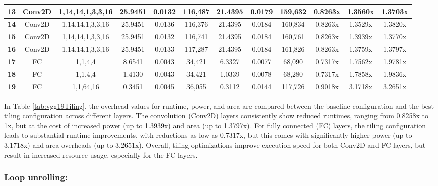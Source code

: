 \begin{table}[htbp]
{\begin{tabular}{|c|c|c|c|c|c|c|c|c|c|c|c|}
\textbf{13} & Conv2D & 1,14,14,1,3,3,16 & 25.9451 & 0.0132  & 116,487 & 21.4395 & 0.0179  & 159,632 & 0.8263x & 1.3560x & 1.3703x \\ \hline
\textbf{14} & Conv2D & 1,14,14,1,3,3,16 & 25.9451 & 0.0136  & 116,376 & 21.4395 & 0.0184  & 160,834 & 0.8263x & 1.3529x & 1.3820x \\ \hline
\textbf{15} & Conv2D & 1,14,14,1,3,3,16 & 25.9451 & 0.0132  & 116,741 & 21.4395 & 0.0184  & 160,761 & 0.8263x & 1.3939x & 1.3770x \\ \hline
\textbf{16} & Conv2D & 1,14,14,1,3,3,16 & 25.9451 & 0.0133  & 117,287 & 21.4395 & 0.0184  & 161,826 & 0.8263x & 1.3759x & 1.3797x \\ \hline
\textbf{17} & FC & 1,1,4,4 & 8.6541  & 0.0043  & 34,421  & 6.3327  & 0.0077  & 68,090  & 0.7317x & 1.7562x & 1.9781x \\ \hline
\textbf{18} & FC & 1,1,4,4 & 1.4130  & 0.0043  & 34,421  & 1.0339  & 0.0078  & 68,280  & 0.7317x & 1.7858x & 1.9836x \\ \hline
\textbf{19} & FC & 1,1,64,16 & 0.3451  & 0.0045  & 36,055  & 0.3112  & 0.0144  & 117,726 & 0.9018x & 3.1718x & 3.2651x \\ \hline

\end{tabular}
}
\end{table}

In Table \ref{tab:vgg19Tiling}, the overhead values for runtime, power, and area are compared between the baseline configuration and the best tiling configuration across different layers. The convolution (Conv2D) layers consistently show reduced runtimes, ranging from 0.8258x to 1x, but at the cost of increased power (up to 1.3939x) and area (up to 1.3797x). For fully connected (FC) layers, the tiling configuration leads to substantial runtime improvements, with reductions as low as 0.7317x, but this comes with significantly higher power (up to 3.1718x) and area overheads (up to 3.2651x). Overall, tiling optimizations improve execution speed for both Conv2D and FC layers, but result in increased resource usage, especially for the FC layers.


\clearpage
\subsubsection{Loop unrolling:}

